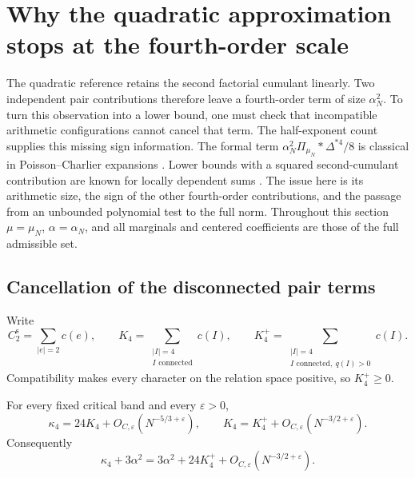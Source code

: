 \section{Why the quadratic approximation stops at the fourth-order scale}
\label{p13:lower:section}

The quadratic reference retains the second factorial cumulant linearly.
Two independent pair contributions therefore leave a fourth-order term of
size $\alpha_N^2$. To turn this observation into a lower bound, one must
check that incompatible arithmetic configurations cannot cancel that term.
The half-exponent count supplies this missing sign information.
The formal term \(\alpha_N^2\Pi_{\mu_N}*\Delta^{*4}/8\)
is classical in Poisson--Charlier expansions
\cite{bkn2014,cekanaviciusvellaisamy2015}.
Lower bounds with a squared second-cumulant contribution are known
for locally dependent sums
\cite[Theorem~2.1, (2.3)]{cekanaviciusvellaisamy2020}.
The issue here is its
arithmetic size, the sign of the other fourth-order contributions,
and the passage from an unbounded polynomial test to the full norm.
Throughout this section $\mu=\mu_N$, $\alpha=\alpha_N$, and all marginals
and centered coefficients are those of the full admissible set.

\subsection{Cancellation of the disconnected pair terms}

Write
\[
 C_2^{\mathrm s}=\sum_{|e|=2}c(e),\qquad
 K_4=\sum_{\substack{|I|=4\\I\text{ connected}}}c(I),\qquad
 K_4^+=\sum_{\substack{|I|=4\\I\text{ connected},\ q(I)>0}}c(I).
\]
Compatibility makes every character on the relation space positive, so
$K_4^+\geq0$.

\begin{lemma}
\label{p13:lower:quartic}
For every fixed critical band and every $\varepsilon>0$,
\begin{equation}
 \kappa_4=24K_4+O_{C,\varepsilon}(N^{-5/3+\varepsilon}),\qquad
 K_4=K_4^++O_{C,\varepsilon}(N^{-3/2+\varepsilon}).
 \label{p13:lower:quartic-identities}
\end{equation}
Consequently
\begin{equation}
 \kappa_4+3\alpha^2
 =3\alpha^2+24K_4^++O_{C,\varepsilon}(N^{-3/2+\varepsilon}).
 \label{p13:lower:positive-quartic}
\end{equation}
\end{lemma}

